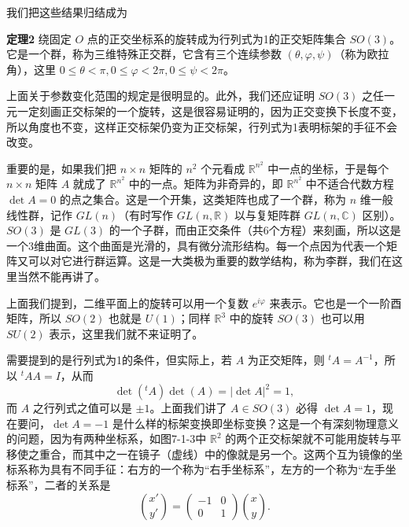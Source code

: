 我们把这些结果归结成为

\noindent\textbf{定理2}\quad
绕固定 $O$ 点的正交坐标系的旋转成为行列式为1的正交矩阵集合 $SO(3)$。它是一个群，称为三维特殊正交群，它含有三个连续参数 $(\theta,\varphi,\psi)$（称为欧拉角），这里 $0\le\theta<\pi,0\le\varphi<2\pi,0\le\psi<2\pi$。

上面关于参数变化范围的规定是很明显的。此外，我们还应证明 $SO(3)$ 之任一元一定刻画正交标架的一个旋转，这是很容易证明的，因为正交变换下长度不变，所以角度也不变，这样正交标架仍变为正交标架，行列式为1表明标架的手征不会改变。

重要的是，如果我们把 $n\times n$ 矩阵的 $n^2$ 个元看成 $\mathbb R^{n^2}$ 中一点的坐标，于是每个 $n\times n$ 矩阵 $A$ 就成了 $\mathbb R^{n^2}$ 中的一点。矩阵为非奇异的，即 $\mathbb R^{n^2}$ 中不适合代数方程 $\det A=0$ 的点之集合。这是一个开集，这类矩阵也成了一个群，称为 $n$ 维一般线性群，记作 $GL(n)$（有时写作 $GL(n,\mathbb R)$ 以与复矩阵群 $GL(n,\mathbb C)$ 区别）。$SO(3)$ 是 $GL(3)$ 的一个子群，而由正交条件（共6个方程）来刻画，所以这是一个3维曲面。这个曲面是光滑的，具有微分流形结构。每一个点因为代表一个矩阵又可以对它进行群运算。这是一大类极为重要的数学结构，称为李群，我们在这里当然不能再讲了。

上面我们提到，二维平面上的旋转可以用一个复数 $e^{i\varphi}$ 来表示。它也是一个一阶酉矩阵，所以 $SO(2)$ 也就是 $U(1)$；同样 $\mathbb R^3$ 中的旋转 $SO(3)$ 也可以用 $SU(2)$ 表示，这里我们就不来证明了。

需要提到的是行列式为1的条件，但实际上，若 $A$ 为正交矩阵，则 ${}^{t}\!A=A^{-1}$，所以 ${}^{t}\!A A=I$，从而
\[
 \det({}^{t}\!A)\det(A)=|\det A|^2=1,
\]
而 $A$ 之行列式之值可以是 $\pm1$。上面我们讲了 $A\in SO(3)$ 必得 $\det A=1$，现在要问，$\det A=-1$ 是什么样的标架变换即坐标变换？这是一个有深刻物理意义的问题，因为有两种坐标系，如图7-1-3中 $\mathbb R^2$ 的两个正交标架就不可能用旋转与平移使之重合，而其中之一在镜子（虚线）中的像就是另一个。这两个互为镜像的坐标系称为具有不同手征：右方的一个称为“右手坐标系”，左方的一个称为“左手坐标系”，二者的关系是
\begin{equation}
 \binom{x'}{y'}=
 \begin{pmatrix}-1&0\\0&1\end{pmatrix}
 \binom{x}{y}.
 \tag{30}
\end{equation}

